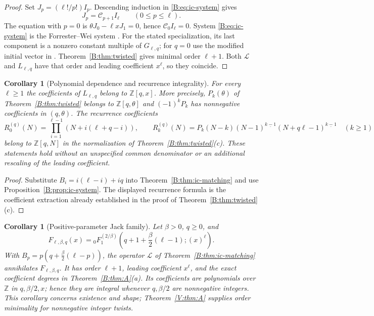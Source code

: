 \documentclass[11pt,a4paper]{article}
\newtheorem{corollary}[theorem]{Corollary}
\theoremstyle{definition}
\theoremstyle{remark}
\newcommand{\ff}[2]{#1^{\underline{#2}}}
\numberwithin{equation}{section}
\begin{document}
\begin{proof}
Set $J_p=(\ell!/p!)I_p$.  Descending induction in \eqref{B:eq:ic-system}
gives
\[
 J_p=\mathcal C_{p+1}I_\ell\qquad(0\le p\le\ell).
\]
The equation with $p=0$ is $\theta J_0-\ell xJ_1=0$, hence
$\mathcal C_0I_\ell=0$.  System \eqref{B:eq:ic-system} is the
Forrester--Wei system \cite[(3.6)]{FW26}.  For the stated specialization,
its last component is a nonzero constant multiple of $G_{\ell,q}$;
for $q=0$ use the modified initial vector in \cite[Remark~3.4(1)]{FW26}.
Theorem~\ref{B:thm:twisted} gives minimal order $\ell+1$.
Both $\mathcal L$ and $L_{\ell,q}$ have that order and leading
coefficient $x^\ell$, so they coincide.
\end{proof}

\begin{corollary}[Polynomial dependence and recurrence integrality]
\label{B:cor:ic-integrality}
For every $\ell\ge1$ the coefficients of $L_{\ell,q}$ belong to
$\mathbb Z[q,x]$.  More precisely, $P_k(\theta)$ of
Theorem~\ref{B:thm:twisted} belongs to $\mathbb Z[q,\theta]$ and
$(-1)^kP_k$ has nonnegative coefficients in $(q,\theta)$.
The recurrence coefficients
\[
 R_0^{(q)}(N)=\prod_{i=1}^{\ell-1}(N+i(\ell+q-i)),\qquad
 R_k^{(q)}(N)=P_k(N-k)
  \ff{(N-1)}{k-1}\ff{(N+q\ell-1)}{k-1}\quad(k\ge1)
\]
belong to $\mathbb Z[q,N]$ in the normalization of
Theorem~\ref{B:thm:twisted}(c).  These statements hold without an unspecified
common denominator or an additional rescaling of the leading coefficient.
\end{corollary}

\begin{proof}
Substitute $B_i=i(\ell-i)+iq$ into
Theorem~\ref{B:thm:ic-matching} and use
Proposition~\ref{B:prop:ic-system}.  The displayed recurrence formula is
the coefficient extraction already established in the proof of
Theorem~\ref{B:thm:twisted}(c).
\end{proof}

\begin{corollary}[Positive-parameter Jack family]\label{B:cor:ic-beta}
Let $\beta>0$, $q\ge0$, and
\[
 F_{\ell,\beta,q}(x)
 ={}_0F_1^{(2/\beta)}\left(q+1+\frac{\beta}{2}(\ell-1);(x)^\ell\right).
\]
With $B_p=p(q+\frac{\beta}{2}(\ell-p))$, the operator $\mathcal L$
of Theorem~\ref{B:thm:ic-matching} annihilates $F_{\ell,\beta,q}$.
It has order $\ell+1$, leading coefficient $x^\ell$, and the exact
coefficient degrees in Theorem~\ref{B:thm:A}(a).  Its coefficients are
polynomials over $\mathbb Z$ in $q,\beta/2,x$; hence they are integral
whenever $q,\beta/2$ are nonnegative integers.
This corollary concerns existence and shape; Theorem~\ref{V:thm:A} supplies order minimality for nonnegative integer twists.
\end{corollary}
\end{document}
